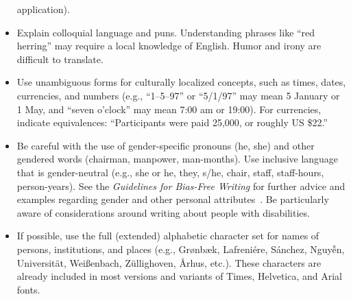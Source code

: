 \begin{itemize}
    application).
  \item Explain colloquial language and puns. Understanding phrases like
    ``red herring'' may require a local knowledge of English.  Humor and
    irony are difficult to translate.
  \item Use unambiguous forms for culturally localized concepts, such as
    times, dates, currencies, and numbers (e.g., ``1--5--97'' or
    ``5/1/97'' may mean 5 January or 1 May, and ``seven o'clock'' may
    mean 7:00 am or 19:00). For currencies, indicate equivalences:
    ``Participants were paid {\selectfont \textwon}
    25,000, or roughly US \$22.''
  \item Be careful with the use of gender-specific pronouns (he, she)
    and other gendered words (chairman, manpower, man-months). Use
    inclusive language that is gender-neutral (e.g., she or he, they,
    s/he, chair, staff, staff-hours, person-years). See the
    \textit{Guidelines for Bias-Free Writing} for further advice and
    examples regarding gender and other personal
    attributes~\cite{Schwartz:1995:GBF}. Be particularly aware of
    considerations around writing about people with disabilities.
  \item If possible, use the full (extended) alphabetic character set
    for names of persons, institutions, and places (e.g.,
    Gr{\o}nb{\ae}k, Lafreni\'ere, S\'anchez, Nguy{\~{\^{e}}}n,
    Universit{\"a}t, Wei{\ss}enbach, Z{\"u}llighoven, \r{A}rhus, etc.).
    These characters are already included in most versions and variants
    of Times, Helvetica, and Arial fonts.
\end{itemize}
